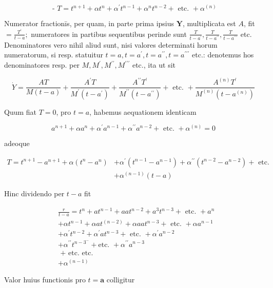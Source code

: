 \documentclass[10pt]{article}
\begin{document}
\[
\text { - } T=t^{n+1}+\alpha t^{n}+\alpha^{\prime} t^{n-1}+\alpha^{n} t^{n-2}+\text { etc. }+\alpha^{(n)}
\]

Numerator fractionīs, per quam, in parte prima ipsius \(\boldsymbol{Y}\), multiplicata est \(A\), fit \(=\frac{T^{\prime}}{t-a} ;\) numeratores in partibus sequentibus perinde sunt \(\frac{T}{t-a^{\prime}}, \frac{T}{t-a^{\prime \prime}}, \frac{T}{t-a^{\prime \prime \prime}}\) etc. Denominatores vero nihil aliud sunt, nisi valores determinati horum numeratorum, si resp. statuitur \(t=a, t=a^{\prime}, t=a^{\prime \prime}, t=a^{\prime \prime \prime}\) etc.: denotemus hos denominatores resp. per \(M, M^{\prime}, M^{\prime \prime}, M^{\prime \prime \prime}\) etc., ita ut sit

\[
\dot{Y}=\frac{A T}{M(t-a)}+\frac{A^{\prime} T}{M^{\prime}\left(t-a^{\prime}\right)}+\frac{A^{\prime \prime} T^{\prime}}{M^{\prime \prime}\left(t-a^{\prime \prime}\right)}+\text { etc. }+\frac{A^{(n)} T^{\prime}}{M^{(n)}\left(t-a^{(n)}\right)}
\]

Quum fiat \(T=0\), pro \(t=a\), habemus aequationem identicam

\[
a^{n+1}+\alpha a^{n}+\alpha^{\prime} a^{n-1}+\alpha^{\prime \prime} a^{n-2}+\text { etc. }+\alpha^{(n)}=0
\]

adeoque

\[
\begin{aligned}
T=t^{n+1}-a^{n+1}+\alpha\left(t^{n}-a^{n}\right) & +\alpha^{\prime}\left(t^{n-1}-a^{n-1}\right)+\alpha^{\prime \prime}\left(t^{n-2}-a^{n-2}\right)+\text { etc. } \\
& +\alpha^{(n-1)}(t-a)
\end{aligned}
\]

Hinc dividendo per \(t-a\) fit

\[
\begin{aligned}
& \frac{r}{t-a}=t^{n}+a t^{n-1}+a a t^{n-2}+a^{3} t^{n-3}+\text { etc. }+a^{n} \\
& +\alpha t^{n-1}+\alpha a t^{(n-2)}+\alpha a a t^{n-3}+\text { etc. }+\alpha a^{n-1} \\
& +\alpha^{\prime} t^{n-2}+\alpha^{\prime} a t^{n-3}+\text { etc. }+\alpha^{\prime} a^{n-2} \\
& +\alpha^{\prime \prime} t^{n-3^{-}}+\text {etc. }+\alpha^{\prime \prime} a^{n-3} \\
& \text { + etc. etc. } \\
& +\alpha^{(n-1)}
\end{aligned}
\]

Valor huius functionis pro \(t=\boldsymbol{a}\) colligitur
\end{document}
